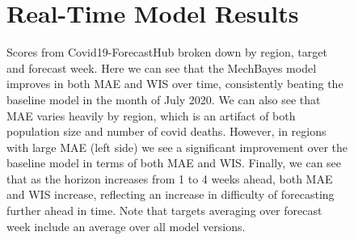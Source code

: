 \documentclass[11pt]{amsart}
\begin{document}
\begin{figure}
\section{Real-Time Model Results}

\caption{Scores from Covid19-ForecastHub broken down by region, target and forecast week. Here we can see that the MechBayes model improves in both MAE and WIS over time, consistently beating the baseline model in the month of July 2020. We can also see that MAE varies heavily by region, which is an artifact of both population size and number of covid deaths. However, in regions with large MAE (left side) we see a significant improvement over the baseline model in terms of both MAE and WIS. Finally, we can see that as the horizon increases from 1 to 4 weeks ahead, both MAE and WIS increase, reflecting an increase in difficulty of forecasting further ahead in time. Note that targets averaging over forecast week include an average over all model versions. }
\label{fig:covidhub_appendix}
\end{figure}


\newpage 


\end{document}
